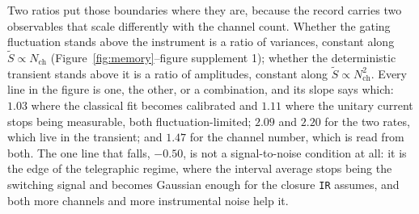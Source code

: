Two ratios put those boundaries where they are, because the record carries two observables that
scale differently with the channel count. Whether the gating fluctuation stands above the
instrument is a ratio of variances, constant along $\widetilde{S} \propto N_{\mathrm{ch}}$
(Figure~\ref{fig:memory}--figure supplement 1); whether the deterministic transient stands above
it is a ratio of amplitudes, constant along $\widetilde{S} \propto N_{\mathrm{ch}}^{2}$. Every
line in the figure is one, the other, or a combination, and its slope says which: $1.03$ where
the classical fit becomes calibrated and $1.11$ where the unitary current stops being
measurable, both fluctuation-limited;
$2.09$ and $2.20$ for the two rates, which live in the
transient; and $1.47$ for the channel number, which is read from both. %
The one line that falls,
$-0.50$, is not a signal-to-noise condition at all: it is the edge of the telegraphic regime, where
the interval average stops being the switching signal and becomes Gaussian enough for the closure
\texttt{IR} assumes, and both more channels and more instrumental noise help it.
